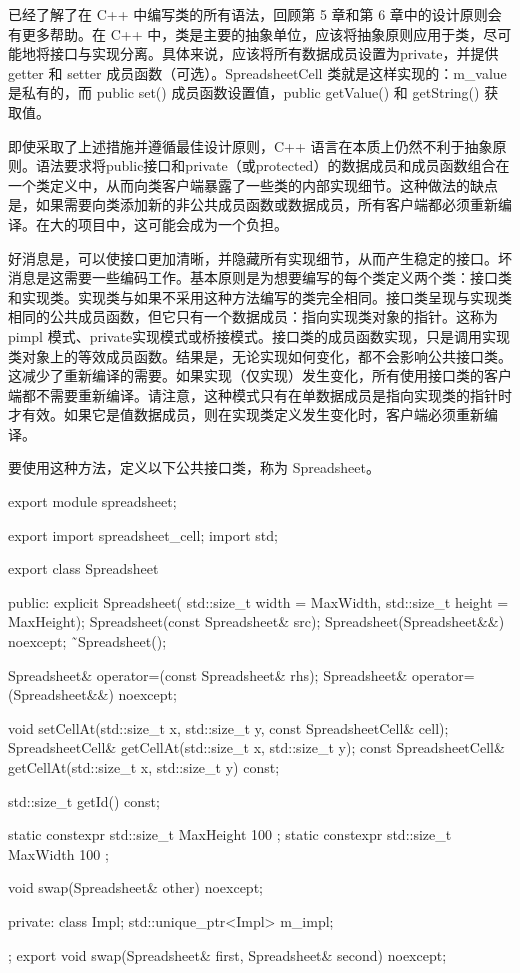 
已经了解了在 C++ 中编写类的所有语法，回顾第 5 章和第 6 章中的设计原则会有更多帮助。在 C++ 中，类是主要的抽象单位，应该将抽象原则应用于类，尽可能地将接口与实现分离。具体来说，应该将所有数据成员设置为private，并提供 getter 和 setter 成员函数（可选）。SpreadsheetCell 类就是这样实现的：m\_value 是私有的，而 public set() 成员函数设置值，public getValue() 和 getString() 获取值。


即使采取了上述措施并遵循最佳设计原则，C++ 语言在本质上仍然不利于抽象原则。语法要求将public接口和private（或protected）的数据成员和成员函数组合在一个类定义中，从而向类客户端暴露了一些类的内部实现细节。这种做法的缺点是，如果需要向类添加新的非公共成员函数或数据成员，所有客户端都必须重新编译。在大的项目中，这可能会成为一个负担。

好消息是，可以使接口更加清晰，并隐藏所有实现细节，从而产生稳定的接口。坏消息是这需要一些编码工作。基本原则是为想要编写的每个类定义两个类：接口类和实现类。实现类与如果不采用这种方法编写的类完全相同。接口类呈现与实现类相同的公共成员函数，但它只有一个数据成员：指向实现类对象的指针。这称为 pimpl 模式、private实现模式或桥接模式。接口类的成员函数实现，只是调用实现类对象上的等效成员函数。结果是，无论实现如何变化，都不会影响公共接口类。这减少了重新编译的需要。如果实现（仅实现）发生变化，所有使用接口类的客户端都不需要重新编译。请注意，这种模式只有在单数据成员是指向实现类的指针时才有效。如果它是值数据成员，则在实现类定义发生变化时，客户端必须重新编译。

要使用这种方法，定义以下公共接口类，称为 Spreadsheet。

\begin{cpp}
export module spreadsheet;

export import spreadsheet_cell;
import std;

export class Spreadsheet
{
    public:
        explicit Spreadsheet(
            std::size_t width = MaxWidth, std::size_t height = MaxHeight);
        Spreadsheet(const Spreadsheet& src);
        Spreadsheet(Spreadsheet&&) noexcept;
        ˜Spreadsheet();

        Spreadsheet& operator=(const Spreadsheet& rhs);
        Spreadsheet& operator=(Spreadsheet&&) noexcept;

        void setCellAt(std::size_t x, std::size_t y, const SpreadsheetCell& cell);
        SpreadsheetCell& getCellAt(std::size_t x, std::size_t y);
        const SpreadsheetCell& getCellAt(std::size_t x, std::size_t y) const;

        std::size_t getId() const;

        static constexpr std::size_t MaxHeight { 100 };
        static constexpr std::size_t MaxWidth { 100 };

        void swap(Spreadsheet& other) noexcept;

    private:
        class Impl;
        std::unique_ptr<Impl> m_impl;
};
export void swap(Spreadsheet& first, Spreadsheet& second) noexcept;
\end{cpp}

